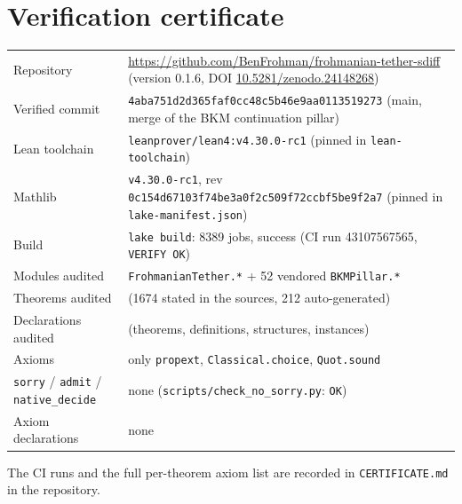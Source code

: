 \documentclass[11pt,a4paper]{article}
\theoremstyle{plain}
\theoremstyle{definition}
\theoremstyle{remark}
\newcommand{\VERSIONDOI}{\href{https://doi.org/10.5281/zenodo.24148268}{10.5281/zenodo.24148268}}
\begin{document}
\section{Verification certificate}\label{app:cert}
\begin{center}
\begin{tabular}{>{\raggedright\arraybackslash}p{}>{\raggedright\arraybackslash}p{}}
\toprule
Repository & \url{https://github.com/BenFrohman/frohmanian-tether-sdiff} (version 0.1.6, DOI \VERSIONDOI)\\
Verified commit & \texttt{4aba751d2d365faf0cc48c5b46e9aa0113519273} (main, merge of the BKM continuation pillar)\\
Lean toolchain & \texttt{leanprover/lean4:v4.30.0-rc1} (pinned in \texttt{lean-toolchain})\\
Mathlib & \texttt{v4.30.0-rc1}, rev \texttt{0c154d67103f74be3a0f2c509f72ccbf5be9f2a7} (pinned in \texttt{lake-manifest.json})\\
Build & \texttt{lake build}: 8389 jobs, success (CI run 43107567565, \texttt{VERIFY OK})\\
Modules audited & 42 \texttt{FrohmanianTether.*} + 52 vendored \texttt{BKMPillar.*}\\
Theorems audited & 1886 (1674 stated in the sources, 212 auto-generated)\\
Declarations audited & 2546 (theorems, definitions, structures, instances)\\
Axioms & only \texttt{propext}, \texttt{Classical.choice}, \texttt{Quot.sound}\\
\texttt{sorry} / \texttt{admit} / \texttt{native\_decide} & none (\texttt{scripts/check\_no\_sorry.py}: \texttt{OK})\\
Axiom declarations & none\\
\bottomrule
\end{tabular}
\end{center}
The CI runs and the full per-theorem axiom list are recorded in \texttt{CERTIFICATE.md} in the repository.
\end{document}
